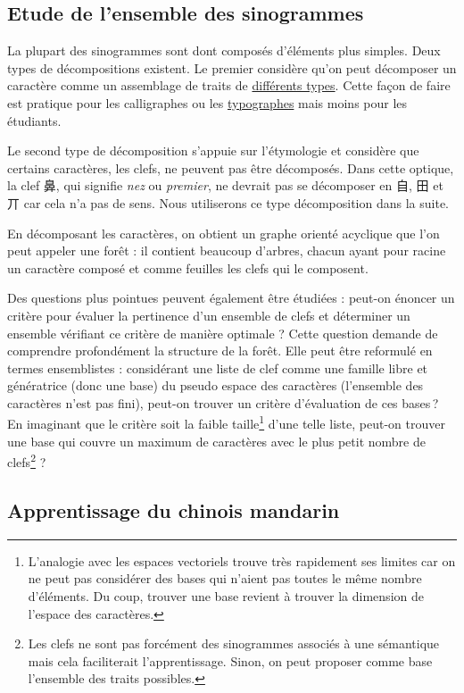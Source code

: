 \documentclass[12pt,oneside]{article}
\begin{document}
\subsection{Etude de l'ensemble des sinogrammes}

La plupart des sinogrammes sont dont composés d'éléments plus simples. Deux types de décompositions existent. Le premier considère qu'on peut décomposer un caractère comme un assemblage de traits de \href{https://en.wikipedia.org/wiki/Stroke\_\%28CJKV\_character\%29}{différents types}. Cette façon de faire est pratique pour les calligraphes ou les \href{http://www.wenlin.com/cdl/}{typographes} mais moins pour les étudiants.

Le second type de décomposition s'appuie sur l'étymologie et considère que certains caractères, les clefs, ne peuvent pas être décomposés. Dans cette optique, la clef {鼻}, qui signifie \textsl{nez} ou \textsl{premier}, ne devrait pas se décomposer en {自}, {田} et {丌} car cela n'a pas de sens. Nous utiliserons ce type décomposition dans la suite.

En décomposant les caractères, on obtient un graphe orienté acyclique que l'on peut appeler une forêt : il contient beaucoup d'arbres, chacun ayant pour racine un caractère composé et comme feuilles les clefs qui le composent.

Des questions plus pointues peuvent également être étudiées : peut-on énoncer un critère pour évaluer la pertinence d'un ensemble de clefs et déterminer un ensemble vérifiant ce critère de manière optimale ? Cette question demande de comprendre profondément la structure de la forêt. Elle peut être reformulé en termes ensemblistes : considérant une liste de clef comme une famille libre et génératrice (donc une base) du pseudo espace des caractères (l'ensemble des caractères n'est pas fini), peut-on trouver un critère d'évaluation de ces bases ? En imaginant que le critère soit la faible taille\footnote{L'analogie avec les espaces vectoriels trouve très rapidement ses limites car on ne peut pas considérer des bases qui n'aient pas toutes le même nombre d'éléments. Du coup, trouver une base revient à trouver la dimension de l'espace des caractères.} d'une telle liste, peut-on trouver une base qui couvre un maximum de caractères avec le plus petit nombre de clefs\footnote{Les clefs ne sont pas forcément des sinogrammes associés à une sémantique mais cela faciliterait l'apprentissage. Sinon, on peut proposer comme base l'ensemble des traits possibles.} ?

\subsection{Apprentissage du chinois mandarin}
\end{document}
